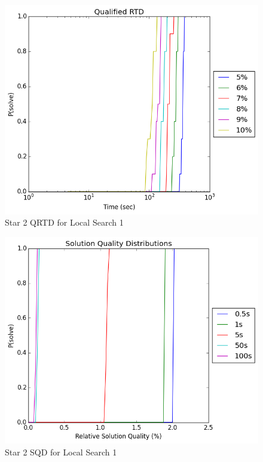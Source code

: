\documentclass{sig-alternate-05-2015}
\begin{document}
\begin{figure}
\centering
\caption{Star 2 QRTD for Local Search 1}
\includegraphics[scale=0.4]{Star2LS1_qrtd_graph_logx.png}
\end{figure}

\begin{figure}
\centering
\caption{Star 2 SQD for Local Search 1}
\includegraphics[scale=0.4]{Star2LS1_sqd_graph.png}
\end{figure}
\end{document}
